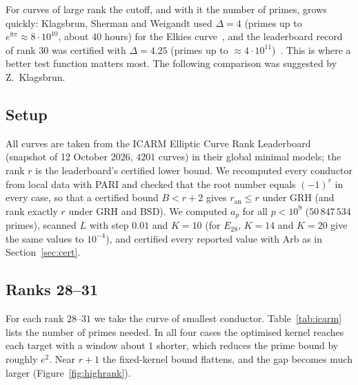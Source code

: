 \documentclass[11pt]{amsart}
\theoremstyle{remark}
\theoremstyle{definition}
\newcommand{\ran}{r_{\mathrm{an}}}
\begin{document}
For curves of large rank the cutoff, and with it the number of primes, grows quickly: Klagsbrun, Sherman and Weigandt used $\Delta=4$ (primes up to $e^{8\pi}\approx 8\cdot10^{10}$, about $40$ hours) for the Elkies curve~\cite{KSW}, and the leaderboard record of rank $30$ was certified with $\Delta=4.25$ (primes up to $\approx4\cdot10^{11}$)~\cite{ICARM}. This is where a better test function matters most. The following comparison was suggested by Z.~Klagsbrun.

\subsection*{Setup}
All curves are taken from the ICARM Elliptic Curve Rank Leaderboard~\cite{ICARM} (snapshot of 12 October 2026, $4201$ curves) in their global minimal models; the rank $r$ is the leaderboard's certified lower bound. We recomputed every conductor from local data with PARI and checked that the root number equals $(-1)^r$ in every case, so that a certified bound $B<r+2$ gives $\ran\le r$ under GRH (and rank exactly $r$ under GRH and BSD). We computed $a_p$ for all $p<10^9$ ($50\,847\,534$ primes), scanned $L$ with step $0.01$ and $K=10$ (for $E_{28}$, $K=14$ and $K=20$ give the same values to $10^{-4}$), and certified every reported value with Arb as in Section~\ref{sec:cert}.

\subsection*{Ranks 28--31}
For each rank $28$--$31$ we take the curve of smallest conductor. Table~\ref{tab:icarm} lists the number of primes needed. In all four cases the optimised kernel reaches each target with a window about $1$ shorter, which reduces the prime bound by roughly $e^{2}$. Near $r+1$ the fixed-kernel bound flattens, and the gap becomes much larger (Figure~\ref{fig:highrank}).
\end{document}
